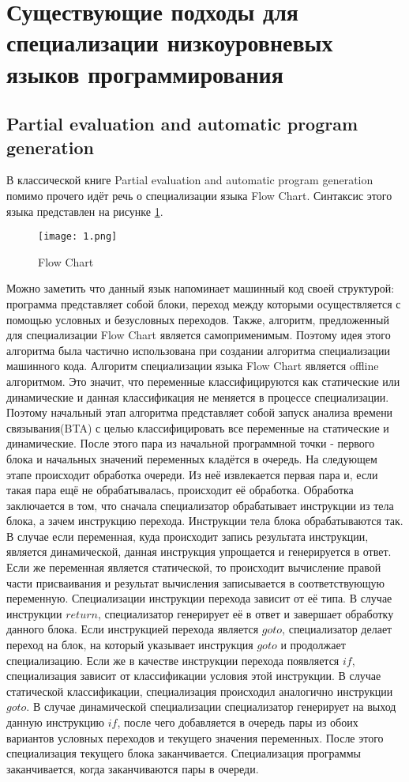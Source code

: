 \documentclass{spbau-diploma}
\begin{document}
\section{Существующие подходы для специализации низкоуровневых языков программирования}

\subsection{Partial evaluation and automatic program generation}
В классической книге Partial evaluation and automatic program generation \cite{PEAPG} помимо прочего идёт речь о специализации языка Flow Chart. Синтаксис этого языка представлен на рисунке \ref{fig:flow}.
\begin{figure}[h]
\texttt{[image: 1.png]}
\caption{ Flow Chart}
\label{fig:flow}
\end{figure}

Можно заметить что данный язык напоминает машинный код своей структурой: программа представляет собой блоки, переход между которыми осуществляется с помощью условных и безусловных переходов. Также, алгоритм, предложенный для специализации Flow Chart является самоприменимым. Поэтому идея этого алгоритма была частично использована при создании алгоритма специализации машинного кода. Алгоритм специализации языка Flow Chart является offline алгоритмом. Это значит, что переменные классифицируются как статические или динамические и данная классификация не меняется в процессе специализации. Поэтому начальный этап алгоритма представляет собой запуск анализа времени связывания(BTA) с целью классифицировать все переменные на статические и динамические. После этого пара из начальной программной точки - первого блока и начальных значений переменных кладётся в очередь. На следующем этапе происходит обработка очереди. Из неё извлекается первая пара и, если такая пара ещё не обрабатывалась, происходит её обработка. Обработка заключается в том, что сначала специализатор обрабатывает инструкции из тела блока, а зачем инструкцию перехода. Инструкции тела блока обрабатываются так. В случае если переменная, куда происходит запись результата инструкции, является динамической, данная инструкция упрощается и генерируется в ответ. Если же переменная является статической, то происходит вычисление правой части присваивания и результат вычисления записывается в соответствующую переменную. Специализации инструкции перехода зависит от её типа. В случае инструкции $return$, специализатор генерирует её в ответ и завершает обработку данного блока. Если инструкцией перехода является $goto$, специализатор делает переход на блок, на который указывает инструкция $goto$ и продолжает специализацию. Если же в качестве инструкции перехода появляется $if$, специализация зависит от классификации условия этой инструкции. В случае статической классификации, специализация происходил аналогично инструкции $goto$. В случае динамической специализации специализатор генерирует на выход данную инструкцию $if$, после чего добавляется в очередь пары из обоих вариантов условных переходов и текущего значения переменных. После этого специализация текущего блока заканчивается. Специализация программы заканчивается, когда заканчиваются пары в очереди. 
\end{document}
